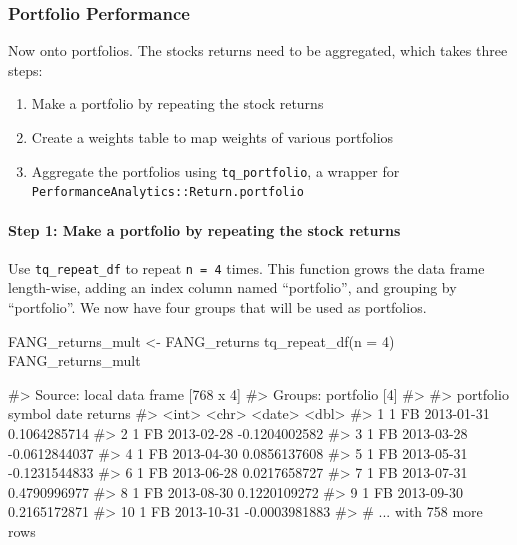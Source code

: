 \subsubsection{Portfolio Performance}\label{portfolio-performance}

Now onto portfolios. The stocks returns need to be aggregated, which
takes three steps:

\begin{enumerate}
\def\labelenumi{\arabic{enumi}.}
\tightlist
\item
  Make a portfolio by repeating the stock returns
\item
  Create a weights table to map weights of various portfolios
\item
  Aggregate the portfolios using \texttt{tq\_portfolio}, a wrapper for
  \texttt{PerformanceAnalytics::Return.portfolio}
\end{enumerate}

\paragraph{Step 1: Make a portfolio by repeating the stock
returns}\label{step-1-make-a-portfolio-by-repeating-the-stock-returns}

Use \texttt{tq\_repeat\_df} to repeat \texttt{n\ =\ 4} times. This
function grows the data frame length-wise, adding an index column named
``portfolio'', and grouping by ``portfolio''. We now have four groups
that will be used as portfolios.

\begin{Schunk}
\begin{Sinput}
FANG_returns_mult <- FANG_returns %
    tq_repeat_df(n = 4)
FANG_returns_mult
\end{Sinput}
\begin{Soutput}
#> Source: local data frame [768 x 4]
#> Groups: portfolio [4]
#> 
#>    portfolio symbol       date       returns
#>        <int>  <chr>     <date>         <dbl>
#> 1          1     FB 2013-01-31  0.1064285714
#> 2          1     FB 2013-02-28 -0.1204002582
#> 3          1     FB 2013-03-28 -0.0612844037
#> 4          1     FB 2013-04-30  0.0856137608
#> 5          1     FB 2013-05-31 -0.1231544833
#> 6          1     FB 2013-06-28  0.0217658727
#> 7          1     FB 2013-07-31  0.4790996977
#> 8          1     FB 2013-08-30  0.1220109272
#> 9          1     FB 2013-09-30  0.2165172871
#> 10         1     FB 2013-10-31 -0.0003981883
#> # ... with 758 more rows
\end{Soutput}
\end{Schunk}

